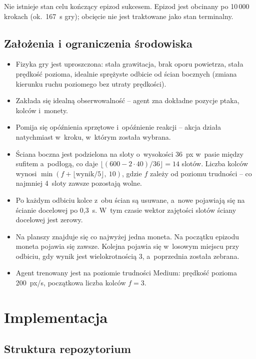 \documentclass[12pt]{article}
\begin{document}
Nie istnieje stan celu kończący epizod sukcesem. Epizod jest obcinany
po 10\,000 krokach (ok.\ 167~s gry); obcięcie nie jest traktowane jako
stan terminalny.

\subsection{Założenia i ograniczenia środowiska}

\begin{itemize}
    \item Fizyka gry jest uproszczona: stała grawitacja, brak oporu
    powietrza, stała prędkość pozioma, idealnie sprężyste odbicie od ścian
    bocznych (zmiana kierunku ruchu poziomego bez utraty prędkości).
    \item Zakłada się idealną obserwowalność -- agent zna dokładne pozycje
    ptaka, kolców i~monety.
    \item Pomija się opóźnienia sprzętowe i~opóźnienie reakcji -- akcja
    działa natychmiast w~kroku, w~którym została wybrana.
    \item Ściana boczna jest podzielona na sloty o~wysokości 36~px
    w~pasie między sufitem a~podłogą, co daje
    $\lfloor (600 - 2 \cdot 40) / 36 \rfloor = 14$ slotów. Liczba kolców
    wynosi $\min\left(f + \lfloor \text{wynik} / 5 \rfloor,\ 10\right)$,
    gdzie $f$ zależy od poziomu trudności -- co najmniej 4~sloty zawsze
    pozostają wolne.
    \item Po każdym odbiciu kolce z~obu ścian są usuwane, a~nowe pojawiają
    się na ścianie docelowej po 0{,}3~s. W~tym czasie wektor zajętości
    slotów ściany docelowej jest zerowy.
    \item Na planszy znajduje się co najwyżej jedna moneta. Na początku
    epizodu moneta pojawia się zawsze. Kolejna pojawia się w~losowym
    miejscu przy odbiciu, gdy wynik jest wielokrotnością 3, a~poprzednia
    została zebrana.
    \item Agent trenowany jest na poziomie trudności Medium: prędkość
    pozioma 200~px/s, początkowa liczba kolców $f = 3$.
\end{itemize}

\section{Implementacja}

\subsection{Struktura repozytorium}
\end{document}

